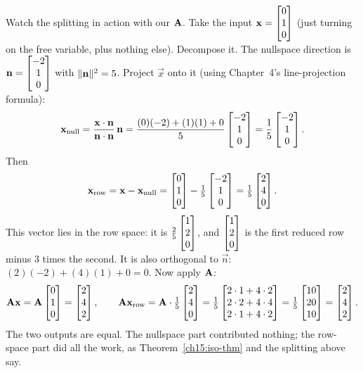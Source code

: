 \begin{example}\label{ch15:splitting}
Watch the splitting in action with our $\mathbf{A}$. Take the input $\mathbf{x}=\begin{bmatrix}0\\1\\0\end{bmatrix}$
(just turning on the free variable, plus nothing else). Decompose it. The nullspace direction is
$\mathbf{n}=\begin{bmatrix}-2\\1\\0\end{bmatrix}$ with $\lVert\mathbf{n}\rVert^2=5$. Project $\vec{x}$ onto it (using Chapter~4's
line-projection formula):
\[
  \mathbf{x}_{\text{null}} = \frac{\mathbf{x}\cdot\mathbf{n}}{\mathbf{n}\cdot\mathbf{n}}\,\mathbf{n}
  = \frac{(0)(-2)+(1)(1)+0}{5}\begin{bmatrix}-2\\1\\0\end{bmatrix}
  = \frac{1}{5}\begin{bmatrix}-2\\1\\0\end{bmatrix}.
\]
Then
\[
  \mathbf{x}_{\text{row}} = \mathbf{x}-\mathbf{x}_{\text{null}}
  = \begin{bmatrix}0\\1\\0\end{bmatrix}-\tfrac{1}{5}\begin{bmatrix}-2\\1\\0\end{bmatrix} = \tfrac{1}{5}\begin{bmatrix}2\\4\\0\end{bmatrix}.
\]
This vector lies in the row space: it is $\tfrac{2}{5}\begin{bmatrix}1\\2\\0\end{bmatrix}$, and
$\begin{bmatrix}1\\2\\0\end{bmatrix}$ is the first reduced row minus $3$ times the second. It is also orthogonal to
$\vec{n}$: $(2)(-2)+(4)(1)+0=0$. Now apply $\mathbf{A}$:
\[
  \mathbf{A}\mathbf{x} = \mathbf{A}\begin{bmatrix}0\\1\\0\end{bmatrix}=\begin{bmatrix}2\\4\\2\end{bmatrix},\qquad
  \mathbf{A}\mathbf{x}_{\text{row}} = \mathbf{A}\cdot\tfrac15\begin{bmatrix}2\\4\\0\end{bmatrix}
  =\tfrac15\begin{bmatrix}2\cdot1+4\cdot2\\2\cdot2+4\cdot4\\2\cdot1+4\cdot2\end{bmatrix}=\tfrac15\begin{bmatrix}10\\20\\10\end{bmatrix}
  =\begin{bmatrix}2\\4\\2\end{bmatrix}.
\]
The two outputs are equal. The nullspace part contributed nothing; the row-space part did all the
work, as Theorem~\ref{ch15:iso-thm} and the splitting above say.
\end{example}

